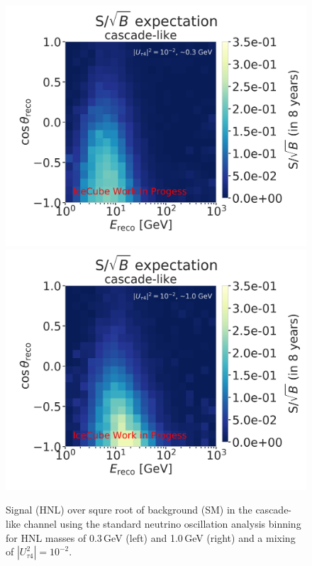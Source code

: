 \documentclass[a4paper,11pt]{article}
\begin{document}
\begin{figure}[h!]
  \includegraphics[height=0.4\linewidth]{figures/2_d_S_over_sqrt(B)_taupede_reco_energy_taupede_reco_coszen_around_0.3_GeV_new.png}
  \includegraphics[height=0.4\linewidth]{figures/2_d_S_over_sqrt(B)_taupede_reco_energy_taupede_reco_coszen_around_1.0_GeV_new.png}
  \caption{Signal (HNL) over squre root of background (SM) in the cascade-like channel using the standard neutrino oscillation analysis binning for HNL masses of 0.3\,GeV (left) and 1.0\,GeV (right) and a mixing of $|U_{\tau4}^2|=10^{-2}$.}
  \label{fig:s_over_sqrt_B_HNL}
\end{figure}
\end{document}
